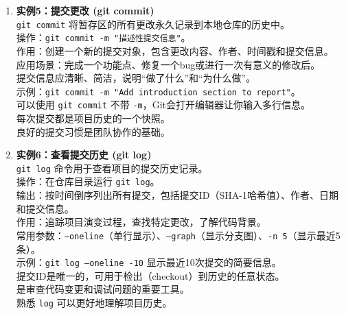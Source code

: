 \documentclass[a4paper, 12pt]{article}
\begin{document}
\begin{enumerate}
    \item \begin{tcolorbox}[instancestyle]
        \textbf{实例5：提交更改 (git commit)} \\
        \texttt{git commit} 将暂存区的所有更改永久记录到本地仓库的历史中。\\
        操作：\texttt{git commit -m "描述性提交信息"}。\\
        作用：创建一个新的提交对象，包含更改内容、作者、时间戳和提交信息。\\
        应用场景：完成一个功能点、修复一个bug或进行一次有意义的修改后。\\
        提交信息应清晰、简洁，说明“做了什么”和“为什么做”。\\
        示例：\texttt{git commit -m "Add introduction section to report"}。\\
        可以使用 \texttt{git commit} 不带 \texttt{-m}，Git会打开编辑器让你输入多行信息。\\
        每次提交都是项目历史的一个快照。\\
        良好的提交习惯是团队协作的基础。
    \end{tcolorbox}

    \item \begin{tcolorbox}[instancestyle]
        \textbf{实例6：查看提交历史 (git log)} \\
        \texttt{git log} 命令用于查看项目的提交历史记录。\\
        操作：在仓库目录运行 \texttt{git log}。\\
        输出：按时间倒序列出所有提交，包括提交ID（SHA-1哈希值）、作者、日期和提交信息。\\
        作用：追踪项目演变过程，查找特定更改，了解代码背景。\\
        常用参数：\texttt{--oneline}（单行显示）、\texttt{--graph}（显示分支图）、\texttt{-n 5}（显示最近5条）。\\
        示例：\texttt{git log --oneline -10} 显示最近10次提交的简要信息。\\
        提交ID是唯一的，可用于检出（checkout）到历史的任意状态。\\
        是审查代码变更和调试问题的重要工具。\\
        熟悉 \texttt{log} 可以更好地理解项目历史。
    \end{tcolorbox}


\end{enumerate}
\end{document}
